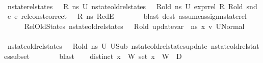 \begin{isabellebody}
\ \ \ \ \ \ \isamarkupfalse%
\ {\isacartoucheopen}nstate{\isacharunderscore}{\kern0pt}rel{\isacharunderscore}{\kern0pt}states\ {\isasymLambda}\ {\isasymLambda}{\isacharprime}{\kern0pt}\ R\ ns\ U{}{\isacartoucheclose}\ {\isacartoucheopen}nstate{\isacharunderscore}{\kern0pt}old{\isacharunderscore}{\kern0pt}rel{\isacharunderscore}{\kern0pt}states\ {\isasymLambda}\ {\isasymLambda}{\isacharprime}{\kern0pt}\ R{\isacharunderscore}{\kern0pt}old\ ns\ U{}{\isacartoucheclose}\ {\isacartoucheopen}expr{\isacharunderscore}{\kern0pt}rel\ R\ R{\isacharunderscore}{\kern0pt}old\ {\isacharparenleft}{\kern0pt}snd\ {\isasymLambda}{\isacharparenright}{\kern0pt}\ e{}\ e{}{\isacartoucheclose}\ {\isacartoucheopen}rel{\isacharunderscore}{\kern0pt}const{\isacharunderscore}{\kern0pt}correct\ {\isasymLambda}\ {\isasymOmega}\ R\ ns{\isacartoucheclose}\ RedE{}\isanewline
\ \ \ \ \ \ \isamarkupfalse%
\ {\isacharparenleft}{\kern0pt}blast\ dest{\isacharcolon}{\kern0pt}\ assume{\isacharunderscore}{\kern0pt}assign{\isacharunderscore}{\kern0pt}nstate{\isacharunderscore}{\kern0pt}rel{\isacharparenright}{\kern0pt}\isanewline
\ \ \ \ \isamarkupfalse%
\ RelOldStates{\isacharcolon}{\kern0pt}\ {\isachardoublequoteopen}nstate{\isacharunderscore}{\kern0pt}old{\isacharunderscore}{\kern0pt}rel{\isacharunderscore}{\kern0pt}states\ {\isasymLambda}\ {\isasymLambda}{\isacharprime}{\kern0pt}\ R{\isacharunderscore}{\kern0pt}old\ {\isacharparenleft}{\kern0pt}update{\isacharunderscore}{\kern0pt}var\ {\isasymLambda}\ ns\ x{}\ v{}{\isacharparenright}{\kern0pt}\ {\isacharquery}{\kern0pt}U{}Normal{\isachardoublequoteclose}\isanewline
\ \ \ \ \ \ \isamarkupfalse%
\ {\isacartoucheopen}nstate{\isacharunderscore}{\kern0pt}old{\isacharunderscore}{\kern0pt}rel{\isacharunderscore}{\kern0pt}states\ {\isasymLambda}\ {\isasymLambda}{\isacharprime}{\kern0pt}\ R{\isacharunderscore}{\kern0pt}old\ ns\ U{}{\isacartoucheclose}\ U{}Sub\ nstate{\isacharunderscore}{\kern0pt}old{\isacharunderscore}{\kern0pt}rel{\isacharunderscore}{\kern0pt}states{\isacharunderscore}{\kern0pt}update\ nstate{\isacharunderscore}{\kern0pt}old{\isacharunderscore}{\kern0pt}rel{\isacharunderscore}{\kern0pt}states{\isacharunderscore}{\kern0pt}subset\isanewline
\ \ \ \ \ \ \isamarkupfalse%
\ blast\isanewline
\ \ \isamarkupfalse%
\ {\isacartoucheopen}distinct\ {\isacharparenleft}{\kern0pt}x{}\ {\isacharhash}{\kern0pt}\ W{\isacharparenright}{\kern0pt}{\isacartoucheclose}\ {\isacartoucheopen}set\ {\isacharparenleft}{\kern0pt}x{}\ {\isacharhash}{\kern0pt}\ W{\isacharparenright}{\kern0pt}\ {\isasyminter}\ D{}\ {\isacharequal}{\kern0pt}\ {\isacharbraceleft}{\kern0pt}{\isacharbraceright}{\kern0pt}{\isacartoucheclose}\ \isamarkupfalse%

\end{isabellebody}

